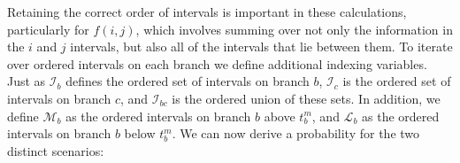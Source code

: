 \documentclass[11pt]{article}
\begin{document}
Retaining the correct order of intervals is important in these calculations, 
particularly for $f(i,j)$, which involves summing over not only the information
in the $i$ and $j$ intervals, but also all of the intervals that lie between 
them. To iterate over ordered intervals on each branch we define additional
indexing variables. Just as $\mathcal{I}_b$ defines the ordered set of intervals 
on branch $b$, $\mathcal{I}_c$ is the ordered set of intervals on branch $c$, and
$\mathcal{I}_{bc}$ is the ordered union of these sets. In addition, we define
$\mathcal{M}_{b}$ as the ordered intervals on branch $b$ above 
$t_b^m$, and $\mathcal{L}_{b}$ as the ordered intervals on branch $b$ 
below $t_b^m$.
We can now derive a probability for the two distinct scenarios:




\end{document}

